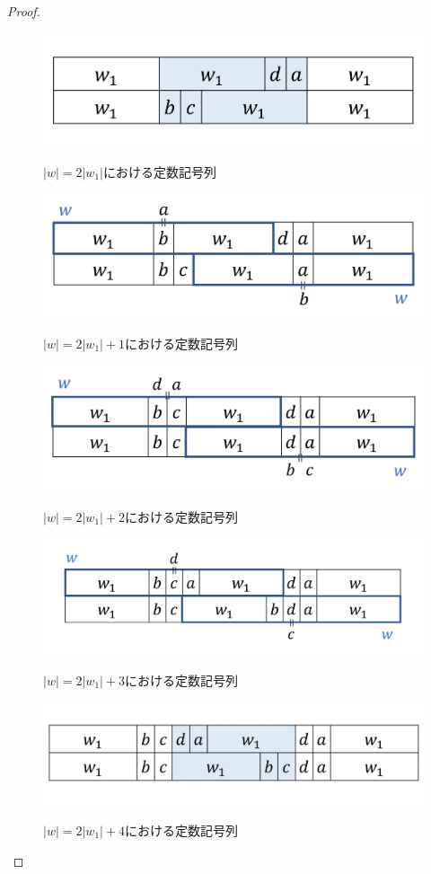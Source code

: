 \begin{proof}
\begin{figure}[t]
  \begin{center}
    \includegraphics[scale=0.35]{figs/w=2w_1.png}
    \caption{$|w| = 2|w_{1}|$における定数記号列}\label{追加部分14}
    \includegraphics[scale=0.35]{figs/w=2w_1+1.png}
    \caption{$|w| = 2|w_{1}|+1$における定数記号列}\label{追加部分13}
    \includegraphics[scale=0.35]{figs/w=2w_1+2.png}
    \caption{$|w| = 2|w_{1}|+2$における定数記号列}\label{追加部分12}
    \includegraphics[scale=0.35]{figs/w=2w_1+3.png}
    \caption{$|w| = 2|w_{1}|+3$における定数記号列}\label{追加部分11}
    \includegraphics[scale=0.35]{figs/w=2w_1+4.png}
    \caption{$|w| = 2|w_{1}|+4$における定数記号列}\label{追加部分10}
  \end{center}
\end{figure}


\end{proof}

